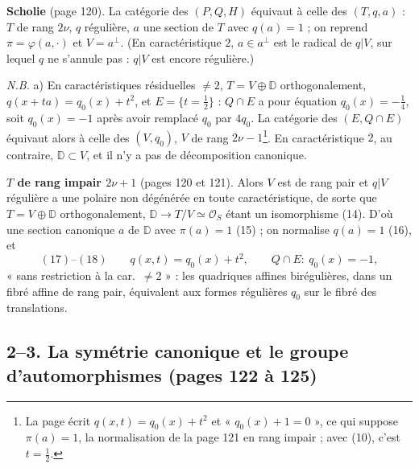 \documentclass[11pt,a4paper]{article}
\begin{document}
\textbf{Scholie} (page 120). La catégorie des $(P, Q, H)$ équivaut à celle des $(T, q,
a)$ : $T$ de rang $2\nu$, $q$ régulière, $a$ une section de $T$ avec $q(a) = 1$ ; on
reprend $\pi = \varphi(a, \cdot)$ et $V = a^{\perp}$. (En caractéristique $2$, $a \in
a^{\perp}$ est le radical de $q|V$, sur lequel $q$ ne s'annule pas : $q|V$ est encore
régulière.)

\emph{N.B.} a) En caractéristiques résiduelles $\neq 2$, $T = V \oplus \mathbb{D}$
orthogonalement, $q(x + ta) = q_0(x) + t^2$, et $E = \{t = \tfrac{1}{2}\}$ : $Q \cap E$
a pour équation $q_0(x) = -\tfrac{1}{4}$, soit $q_0(x) = -1$ après avoir remplacé $q_0$
par $4q_0$. La catégorie des $(E, Q \cap E)$ équivaut alors à celle des $(V, q_0)$, $V$
de rang $2\nu - 1$\footnote{La page écrit $q(x, t) = q_0(x) + t^2$ et « $q_0(x) + 1 =
0$ », ce qui suppose $\pi(a) = 1$, la normalisation de la page 121 en rang impair ;
avec (10), c'est $t = \frac{1}{2}$.}. En caractéristique $2$, au contraire, $\mathbb{D}
\subset V$, et il n'y a pas de décomposition canonique.

\textbf{$T$ de rang impair $2\nu + 1$} (pages 120 et 121). Alors $V$ est de rang pair
et $q|V$ régulière a une polaire non dégénérée en toute caractéristique, de sorte que
$T = V \oplus \mathbb{D}$ orthogonalement, $\mathbb{D} \to T/V \simeq \mathcal{O}_S$ étant un
isomorphisme (14). D'où une section canonique $a$ de $\mathbb{D}$ avec $\pi(a) = 1$
(15) ; on normalise $q(a) = 1$ (16), et
\[
  (17)\text{--}(18) \qquad q(x, t) = q_0(x) + t^2, \qquad Q \cap E : \ q_0(x) = -1,
\]
« sans restriction à la car.\ $\neq 2$ » : les quadriques affines birégulières, dans un
fibré affine de rang pair, équivalent aux formes régulières $q_0$ sur le fibré des
translations.

\subsection*{2--3. La symétrie canonique et le groupe d'automorphismes (pages 122 à 125)}
\end{document}
